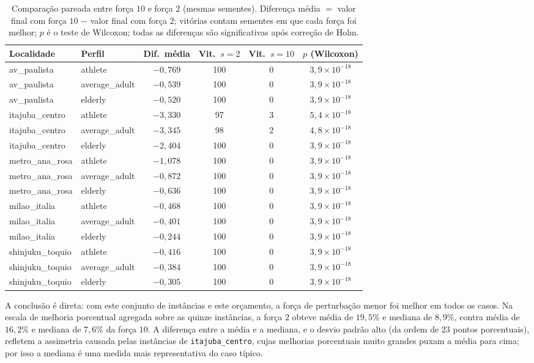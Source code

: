 \documentclass[11pt,a4paper]{article}
\newcommand{\code}[1]{\texttt{#1}}
\begin{document}
\begin{table}[h]
\centering
\caption{Comparação pareada entre força $10$ e força $2$ (mesmas sementes). Diferença média $=$ valor final com força $10$ $-$ valor final com força $2$; vitórias contam sementes em que cada força foi melhor; $p$ é o teste de Wilcoxon; todas as diferenças são significativas após correção de Holm.}
\label{tab:pareado}
\renewcommand{\arraystretch}{1.15}
\begin{tabular}{@{}l l c c c c@{}}
\toprule
Localidade & Perfil & Dif.\ média & Vit.\ $s{=}2$ & Vit.\ $s{=}10$ & $p$ (Wilcoxon) \\
\midrule
av\_paulista & athlete & $-0{,}769$ & 100 & 0 & $3{,}9\times10^{-18}$ \\
av\_paulista & average\_adult & $-0{,}539$ & 100 & 0 & $3{,}9\times10^{-18}$ \\
av\_paulista & elderly & $-0{,}520$ & 100 & 0 & $3{,}9\times10^{-18}$ \\
itajuba\_centro & athlete & $-3{,}330$ & 97 & 3 & $5{,}4\times10^{-18}$ \\
itajuba\_centro & average\_adult & $-3{,}345$ & 98 & 2 & $4{,}8\times10^{-18}$ \\
itajuba\_centro & elderly & $-2{,}404$ & 100 & 0 & $3{,}9\times10^{-18}$ \\
metro\_ana\_rosa & athlete & $-1{,}078$ & 100 & 0 & $3{,}9\times10^{-18}$ \\
metro\_ana\_rosa & average\_adult & $-0{,}872$ & 100 & 0 & $3{,}9\times10^{-18}$ \\
metro\_ana\_rosa & elderly & $-0{,}636$ & 100 & 0 & $3{,}9\times10^{-18}$ \\
milao\_italia & athlete & $-0{,}468$ & 100 & 0 & $3{,}9\times10^{-18}$ \\
milao\_italia & average\_adult & $-0{,}401$ & 100 & 0 & $3{,}9\times10^{-18}$ \\
milao\_italia & elderly & $-0{,}244$ & 100 & 0 & $3{,}9\times10^{-18}$ \\
shinjuku\_toquio & athlete & $-0{,}416$ & 100 & 0 & $3{,}9\times10^{-18}$ \\
shinjuku\_toquio & average\_adult & $-0{,}384$ & 100 & 0 & $3{,}9\times10^{-18}$ \\
shinjuku\_toquio & elderly & $-0{,}305$ & 100 & 0 & $3{,}9\times10^{-18}$ \\
\bottomrule
\end{tabular}
\end{table}

A conclusão é direta: com este conjunto de instâncias e este orçamento, a força de perturbação menor foi melhor em todos os casos. Na escala de melhoria porcentual agregada sobre as quinze instâncias, a força $2$ obteve média de $19{,}5\%$ e mediana de $8{,}9\%$, contra média de $16{,}2\%$ e mediana de $7{,}6\%$ da força $10$. A diferença entre a média e a mediana, e o desvio padrão alto (da ordem de $23$ pontos porcentuais), refletem a assimetria causada pelas instâncias de \code{itajuba\_centro}, cujas melhorias porcentuais muito grandes puxam a média para cima; por isso a mediana é uma medida mais representativa do caso típico.
\end{document}
